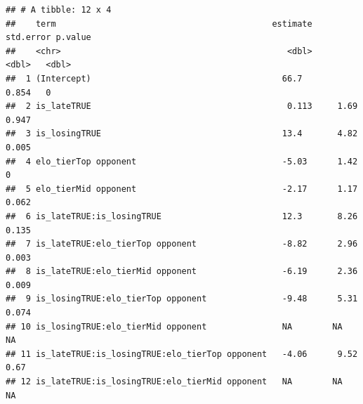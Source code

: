 \documentclass[
]{article}
\begin{document}
\begin{verbatim}
## # A tibble: 12 x 4
##    term                                           estimate std.error p.value
##    <chr>                                             <dbl>     <dbl>   <dbl>
##  1 (Intercept)                                      66.7       0.854   0    
##  2 is_lateTRUE                                       0.113     1.69    0.947
##  3 is_losingTRUE                                    13.4       4.82    0.005
##  4 elo_tierTop opponent                             -5.03      1.42    0    
##  5 elo_tierMid opponent                             -2.17      1.17    0.062
##  6 is_lateTRUE:is_losingTRUE                        12.3       8.26    0.135
##  7 is_lateTRUE:elo_tierTop opponent                 -8.82      2.96    0.003
##  8 is_lateTRUE:elo_tierMid opponent                 -6.19      2.36    0.009
##  9 is_losingTRUE:elo_tierTop opponent               -9.48      5.31    0.074
## 10 is_losingTRUE:elo_tierMid opponent               NA        NA      NA    
## 11 is_lateTRUE:is_losingTRUE:elo_tierTop opponent   -4.06      9.52    0.67 
## 12 is_lateTRUE:is_losingTRUE:elo_tierMid opponent   NA        NA      NA
\end{verbatim}
\end{document}

